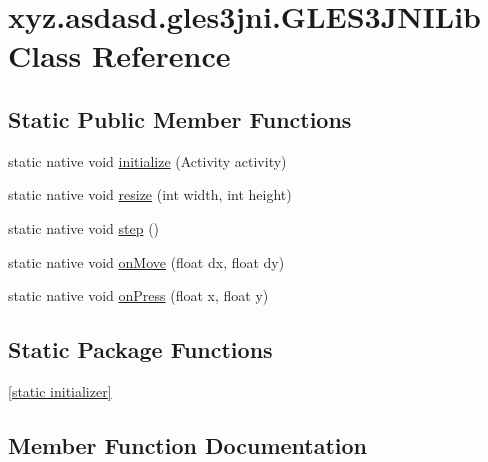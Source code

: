 \hypertarget{classxyz_1_1asdasd_1_1gles3jni_1_1_g_l_e_s3_j_n_i_lib}{}\section{xyz.\+asdasd.\+gles3jni.\+G\+L\+E\+S3\+J\+N\+I\+Lib Class Reference}
\label{classxyz_1_1asdasd_1_1gles3jni_1_1_g_l_e_s3_j_n_i_lib}
\subsection*{Static Public Member Functions}
\begin{DoxyCompactItemize}
\item 
static native void \hyperlink{classxyz_1_1asdasd_1_1gles3jni_1_1_g_l_e_s3_j_n_i_lib_af328cbf694ae834ea4de852144f8bc9e}{initialize} (Activity activity)
\item 
static native void \hyperlink{classxyz_1_1asdasd_1_1gles3jni_1_1_g_l_e_s3_j_n_i_lib_aa21f791346b5ffd6c2d6368da0903276}{resize} (int width, int height)
\item 
static native void \hyperlink{classxyz_1_1asdasd_1_1gles3jni_1_1_g_l_e_s3_j_n_i_lib_ac8eed64be6c912b3c45b9e54db165cb6}{step} ()
\item 
static native void \hyperlink{classxyz_1_1asdasd_1_1gles3jni_1_1_g_l_e_s3_j_n_i_lib_a338d505395c1c6d77d77ceab47e325ab}{on\+Move} (float dx, float dy)
\item 
static native void \hyperlink{classxyz_1_1asdasd_1_1gles3jni_1_1_g_l_e_s3_j_n_i_lib_accaee0101c5b5b96e5f61da93da221d1}{on\+Press} (float x, float y)
\end{DoxyCompactItemize}
\subsection*{Static Package Functions}
\begin{DoxyCompactItemize}
\item 
\hyperlink{classxyz_1_1asdasd_1_1gles3jni_1_1_g_l_e_s3_j_n_i_lib_a9a9db2c2cda4e64d0bd795df300d908b}{\mbox{[}static initializer\mbox{]}}
\end{DoxyCompactItemize}


\subsection{Member Function Documentation}
\mbox{\label{classxyz_1_1asdasd_1_1gles3jni_1_1_g_l_e_s3_j_n_i_lib_a9a9db2c2cda4e64d0bd795df300d908b}} 
